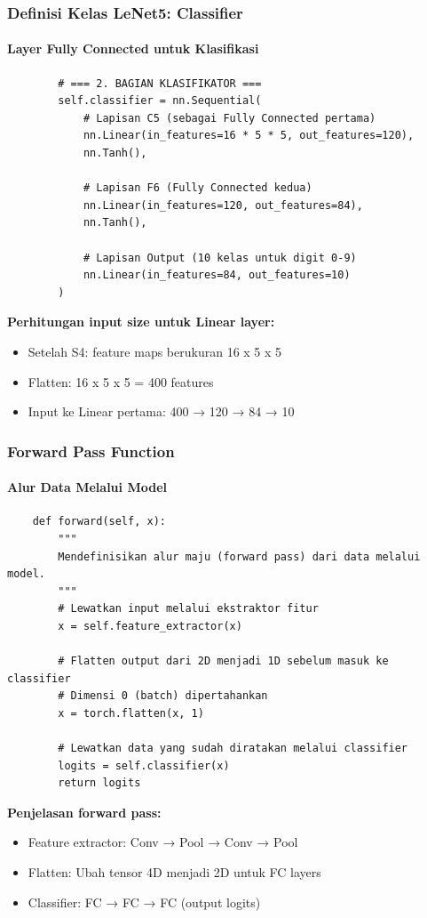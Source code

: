 \documentclass[t,aspectratio=169,xcolor=dvipsnames]{beamer}
\begin{document}
\begin{frame}[fragile]
    \frametitle{Definisi Kelas LeNet5: Classifier}
    \framesubtitle{Layer Fully Connected untuk Klasifikasi}
    \scriptsize

\begin{verbatim}
        # === 2. BAGIAN KLASIFIKATOR ===
        self.classifier = nn.Sequential(
            # Lapisan C5 (sebagai Fully Connected pertama)
            nn.Linear(in_features=16 * 5 * 5, out_features=120),
            nn.Tanh(),

            # Lapisan F6 (Fully Connected kedua)
            nn.Linear(in_features=120, out_features=84),
            nn.Tanh(),

            # Lapisan Output (10 kelas untuk digit 0-9)
            nn.Linear(in_features=84, out_features=10)
        )
\end{verbatim}

    \textbf{Perhitungan input size untuk Linear layer:}
    \begin{itemize}
        \item Setelah S4: feature maps berukuran 16 x 5 x 5
        \item Flatten: 16 x 5 x 5 = 400 features
        \item Input ke Linear pertama: 400 → 120 → 84 → 10
    \end{itemize}

\end{frame}

\begin{frame}[fragile]
    \frametitle{Forward Pass Function}
    \framesubtitle{Alur Data Melalui Model}
    \scriptsize

\begin{verbatim}
    def forward(self, x):
        """
        Mendefinisikan alur maju (forward pass) dari data melalui model.
        """
        # Lewatkan input melalui ekstraktor fitur
        x = self.feature_extractor(x)
        
        # Flatten output dari 2D menjadi 1D sebelum masuk ke classifier
        # Dimensi 0 (batch) dipertahankan
        x = torch.flatten(x, 1)
        
        # Lewatkan data yang sudah diratakan melalui classifier
        logits = self.classifier(x)
        return logits
\end{verbatim}

    \textbf{Penjelasan forward pass:}
    \begin{itemize}
        \item Feature extractor: Conv → Pool → Conv → Pool
        \item Flatten: Ubah tensor 4D menjadi 2D untuk FC layers
        \item Classifier: FC → FC → FC (output logits)
    \end{itemize}

\end{frame}
\end{document}
